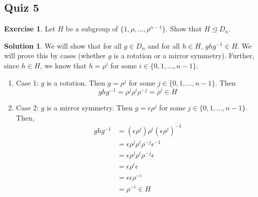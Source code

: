 \documentclass[12pt]{article}
\theoremstyle{definition}
\newcommand{\e}{\epsilon}
\newtheorem{exercise}{\color{YellowOrange}Exercise}
\theoremstyle{definition}
\newtheorem{solution}{\color{Goldenrod}Solution}
\begin{document}
\subsection{Quiz 5}
\begin{exercise}
	Let $H$ be a subgroup of $\{1, \rho, \ldots, \rho^{n-1}\}$. Show that $H \trianglelefteq D_n$. 
\end{exercise}
\begin{solution}
	We will show that for all $g \in D_n$ and for all $h \in H$, $ghg^{-1} \in H$. We will prove this by cases (whether $g$ is a rotation or a mirror symmetry). Further, since $h \in H$, we know that $h = \rho^{i}$ for some $i \in \{0,1,\ldots, n-1\}$. 
	\begin{enumerate}
		\item Case 1: $g$ is a rotation. Then $g = \rho^j$ for some $j \in \{0,1,\ldots, n-1\}$. Then
		\begin{equation}
			ghg^{-1} = \rho^j \rho^i \rho^{-j} = \rho^i \in H
		\end{equation}
		\item Case 2: $g$ is a mirror symmetry. Then $g = \e \rho^j$ for some $j \in \{0,1,\ldots, n-1\}$. Then,
		\begin{align*}
			ghg^{-1} &= (\e \rho^j)\rho^i(\e \rho^j)^{-1} \\
			&= \e \rho^j \rho^i \rho^{-j} \e^{-1} \\
			&= \e \rho^j \rho^i \rho^{-j} \e \\
			&= \e \rho^i \e \\
			&= \e \e \rho^{-i} \\
			&= \rho^{-i} \in H \tag{since $H$ is a subgroup, contains inverses}
		\end{align*}
	\end{enumerate}
\end{solution}
\end{document}
